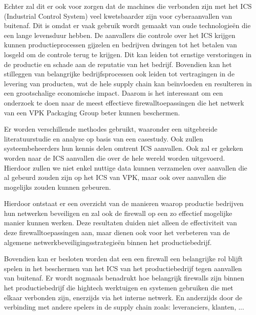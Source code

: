 Echter zal dit er ook voor zorgen dat de machines die verbonden zijn met het ICS (Industrial Control System) veel kwetsbaarder zijn voor cyberaanvallen van buitenaf. Dit is omdat er vaak gebruik wordt gemaakt van oude technologieën die een lange levensduur hebben. De aanvallers die controle over het ICS krijgen kunnen productieprocessen gijzelen en bedrijven dwingen tot het betalen van losgeld om de controle terug te krijgen. Dit kan leiden tot ernstige verstoringen in de productie en schade aan de reputatie van het bedrijf. Bovendien kan het stilleggen van belangrijke bedrijfsprocessen ook leiden tot vertragingen in de levering van producten, wat de hele supply chain kan beïnvloeden en resulteren in een grootschalige economische impact. Daarom is het interessant om een onderzoek te doen naar de meest effectieve firewalltoepassingen die het netwerk van een VPK Packaging Group beter kunnen beschermen. 

Er worden verschillende methodes gebruikt, waaronder een uitgebreide literatuurstudie en analyse op basis van een casestudy. Ook zullen systeembeheerders hun kennis delen omtrent ICS aanvallen. Ook zal er gekeken worden naar de ICS aanvallen die over de hele wereld worden uitgevoerd. Hierdoor zullen we niet enkel nuttige data kunnen verzamelen over aanvallen die al gebeurd zouden zijn op het ICS van VPK, maar ook over aanvallen die mogelijks zouden kunnen gebeuren.

Hierdoor ontstaat er een overzicht van de manieren waarop productie bedrijven hun netwerken beveiligen en zal ook de firewall op een zo effectief mogelijke manier kunnen werken. Deze resultaten duiden niet alleen de effectiviteit van deze firewalltoepassingen aan, maar dienen ook voor het verbeteren van de algemene netwerkbeveiligingsstrategieën binnen het productiebedrijf.

Bovendien kan er besloten worden dat een een firewall een belangrijke rol blijft spelen in het beschermen van het ICS van het productiebedrijf tegen aanvallen van buitenaf. Er wordt nogmaals benadrukt hoe belangrijk firewalls zijn binnen het productiebedrijf die hightech werktuigen en systemen gebruiken die met elkaar verbonden zijn, enerzijds via het interne netwerk. En anderzijds door de verbinding met andere spelers in de supply chain zoals: leveranciers, klanten, ...
